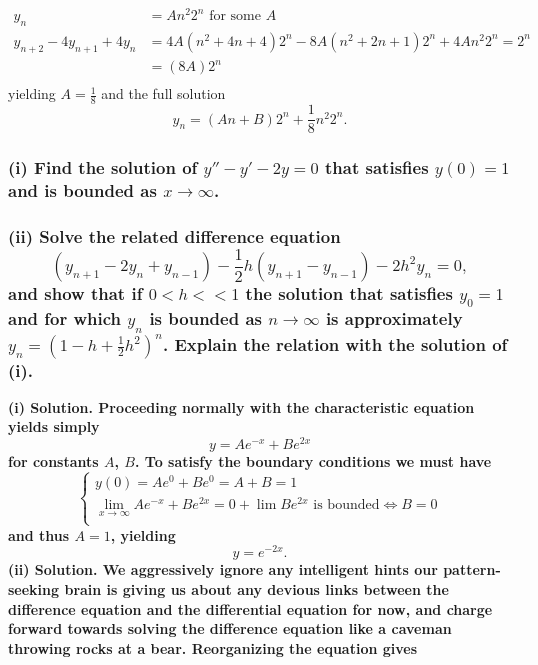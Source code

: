 \documentclass{article}
\begin{document}
\begin{equation*}
    \begin{aligned}
        y_n &= An^2 2^n \text{ for some $A$} \\
        y_{n+2}-4y_{n+1}+4y_n &= 4A(n^2+4n+4)2^n - 8A(n^2+2n+1)2^n + 4An^2 2^n = 2^n \\
        &=(8A)2^n \\
    \end{aligned}
\end{equation*} 
yielding $A=\frac{1}{8}$ and the full solution
\begin{equation*}
    y_n = (An+B)2^n + \frac{1}{8}n^2 2^n.
\end{equation*}

\hrulefill

\subsubsection*{(i) Find the solution of $y''-y'-2y=0$ that satisfies $y(0) = 1$ and is bounded as $x \to \infty$. \\ \\
(ii) Solve the related difference equation 
\begin{equation*}
    (y_{n+1}-2y_n + y_{n-1}) - \frac{1}{2}h(y_{n+1}-y_{n-1}) - 2h^2 y_n = 0,
\end{equation*}
and show that if $0 < h << 1$ the solution that satisfies $y_0 = 1$ and for which $y_n$ is bounded as $n \to \infty$ is approximately $y_n = (1-h+\frac{1}{2}h^2)^n$. Explain the relation with the solution of (i).}
\bf (i) Solution. \normalfont Proceeding normally with the characteristic equation yields simply
\begin{equation*}
    y = Ae^{-x}+Be^{2x}
\end{equation*}
for constants $A$, $B$. To satisfy the boundary conditions we must have
\begin{equation*}
    \begin{cases}
        y(0) = Ae^0 + Be^0 = A + B = 1 \\
        \lim_{x\to \infty} Ae^{-x} + Be^{2x} = 0 + \lim Be^{2x} \text{ is bounded} \iff B = 0 \\
    \end{cases}
\end{equation*}
and thus $A = 1$, yielding
\begin{equation*}
    y =e^{-2x}.
\end{equation*}
\bf (ii) Solution. \normalfont We aggressively ignore any intelligent hints our pattern-seeking brain is giving us about any devious links between the difference equation and the differential equation for now, and charge forward towards solving the difference equation like a caveman throwing rocks at a bear. Reorganizing the equation gives
\end{document}
